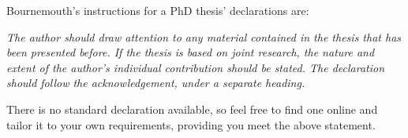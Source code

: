 

\begin{declaration}
Bournemouth's instructions for a PhD thesis' declarations are:

\textit{The author should draw attention to any material contained in the thesis that has been presented before. If the thesis is based on joint research, the nature and extent of the author's individual contribution should be stated. The declaration should follow the acknowledgement, under a separate heading.}

There is no standard declaration available, so feel free to find one online and tailor it to your own requirements, providing you meet the above statement.

\end{declaration}
